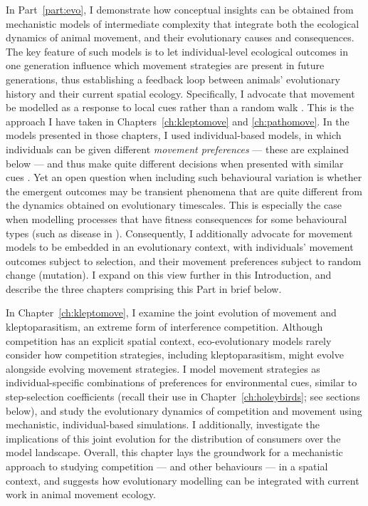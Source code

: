 In Part~\ref{part:evo}, I demonstrate how conceptual insights can be obtained from mechanistic models of intermediate complexity that integrate both the ecological dynamics of animal movement, and their evolutionary causes and consequences.
The key feature of such models is to let individual-level ecological outcomes in one generation influence which movement strategies are present in future generations, thus establishing a feedback loop between animals' evolutionary history and their current spatial ecology.
Specifically, I advocate that movement be modelled as a response to local cues rather than a random walk \citep[`mechanistic'; see][]{mueller2011}.
This is the approach I have taken in Chapters~\ref{ch:kleptomove} and \ref{ch:pathomove}.
In the models presented in those chapters, I used individual-based models, in which individuals can be given different \emph{movement preferences} --- these are explained below --- and thus make quite different decisions when presented with similar cues \citep{getz2015,white2018}.
Yet an open question when including such behavioural variation is whether the emergent outcomes may be transient phenomena that are quite different from the dynamics obtained on evolutionary timescales.
This is especially the case when modelling processes that have fitness consequences for some behavioural types (such as disease in \cite[]{white2018}).
Consequently, I additionally advocate for movement models to be embedded in an evolutionary context, with individuals' movement outcomes subject to selection, and their movement preferences subject to random change (mutation).
I expand on this view further in this Introduction, and describe the three chapters comprising this Part in brief below.

In Chapter~\ref{ch:kleptomove}, I examine the joint evolution of movement and kleptoparasitism, an extreme form of interference competition.
Although competition has an explicit spatial context, eco-evolutionary models rarely consider how competition strategies, including kleptoparasitism, might evolve alongside evolving movement strategies.
I model movement strategies as individual-specific combinations of preferences for environmental cues, similar to step-selection coefficients (recall their use in Chapter~\ref{ch:holeybirds}; see sections below), and study the evolutionary dynamics of competition and movement using mechanistic, individual-based simulations.
I additionally, investigate the implications of this joint evolution for the distribution of consumers over the model landscape.
Overall, this chapter lays the groundwork for a mechanistic approach to studying competition --- and other behaviours --- in a spatial context, and suggests how evolutionary modelling can be integrated with current work in animal movement ecology.

